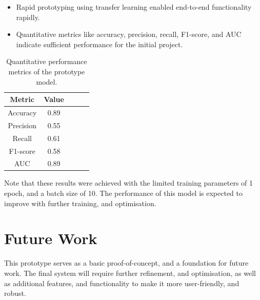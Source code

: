 \documentclass[../main]{subfiles}
\begin{document}
\begin{itemize}
	\item Rapid prototyping using transfer learning enabled end-to-end functionality rapidly.
	\item Quantitative metrics like accuracy, precision, recall, F1-score, and AUC indicate sufficient performance for the initial project.
\end{itemize}

\begin{table}[h]
	\centering
	\begin{tabular}{|c|c|c|c|c|}
		\hline
		Metric & Value \\
		\hline
		Accuracy & 0.89 \\
		Precision & 0.55 \\
		Recall & 0.61 \\
		F1-score & 0.58 \\
		AUC & 0.89 \\
		\hline
	\end{tabular}
	\caption{Quantitative performance metrics of the prototype model.}
	\label{tab:prototype_metrics}
\end{table}

\noindent Note that these results were achieved with the limited training parameters of 1 epoch, and a batch size of 10. The performance of this model is expected to improve with further training, and optimisation.

\section{Future Work}
This prototype serves as a basic proof-of-concept, and a foundation for future work. The final system will require further refinement, and optimisation, as well as additional features, and functionality to make it more user-friendly, and robust.
\end{document}
